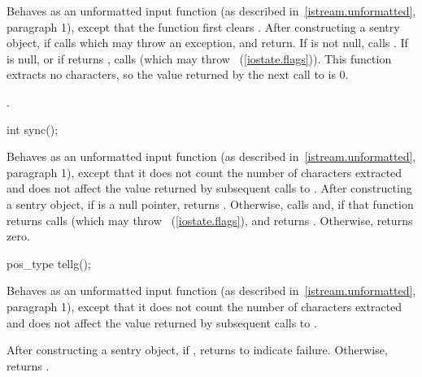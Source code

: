 \begin{itemdescr}
\pnum
\effects
Behaves as an unformatted input function (as described in~\ref{istream.unformatted}, paragraph
1), except that the function first clears .
After constructing
a sentry object, if
calls
which may throw an exception,
and return.
If
is not null, calls
.
If
is null, or if
returns
,
calls
(which may throw
~(\ref{iostate.flags})).
\enternote
This
function extracts no characters, so the value returned by the next call to
is 0.
\exitnote

\pnum
\returns
{}.
\end{itemdescr}

%
\begin{itemdecl}
int sync();
\end{itemdecl}

\begin{itemdescr}
\pnum
\effects
Behaves as an unformatted input function (as described in~\ref{istream.unformatted}, paragraph 1), except that it does not
count the number of characters extracted and does not affect the
value returned by subsequent calls to
.
After constructing
a sentry object, if
is a null pointer, returns .
Otherwise, calls
and, if that function returns 
calls
(which may throw
~(\ref{iostate.flags}),
and returns
.
Otherwise, returns zero.
\end{itemdescr}

%
%
\begin{itemdecl}
pos_type tellg();
\end{itemdecl}

\begin{itemdescr}
\pnum
\effects
Behaves as an unformatted input function (as described in~\ref{istream.unformatted}, paragraph 1), except that it does not count
the number of characters extracted and does not affect the value
returned by subsequent calls to
.

\pnum
\returns
After constructing a sentry object, if
,
returns
to indicate failure.
Otherwise, returns
.
\end{itemdescr}

